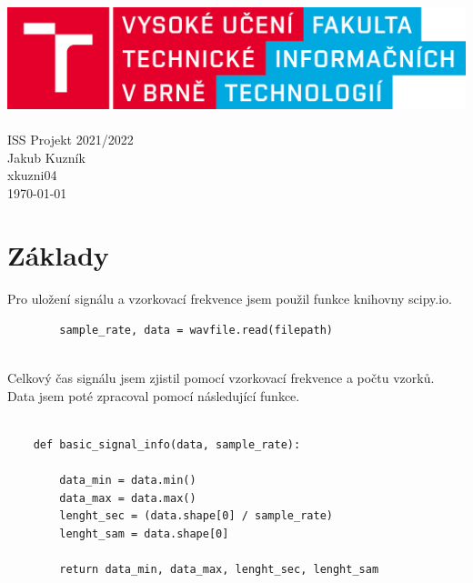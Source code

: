 \documentclass[a4paper, 11pt]{article}
\begin{document}
\begin{titlepage}
    \begin{center}
        \includegraphics[scale=0.15]{fit_logo.png}\\
         \\
        \huge ISS Projekt 2021/2022 \\ 
        \hfill \break
        \huge Jakub Kuzník \\
        \huge xkuzni04 \\

        {\Large\noindent \today}
    \end{center}
    
\end{titlepage}

\tableofcontents
\newpage



%
\section{Základy}
    Pro uložení signálu a vzorkovací frekvence jsem použil funkce knihovny scipy.io.
    \begin{verbatim}
        sample_rate, data = wavfile.read(filepath)
    \end{verbatim}  
    \\
Celkový čas signálu jsem zjistil pomocí vzorkovací frekvence a počtu vzorků. Data jsem poté zpracoval pomocí následující funkce.  

\begin{verbatim}

    def basic_signal_info(data, sample_rate):

        data_min = data.min()
        data_max = data.max()
        lenght_sec = (data.shape[0] / sample_rate)
        lenght_sam = data.shape[0]

        return data_min, data_max, lenght_sec, lenght_sam
\end{verbatim} \\\\
\end{document}
